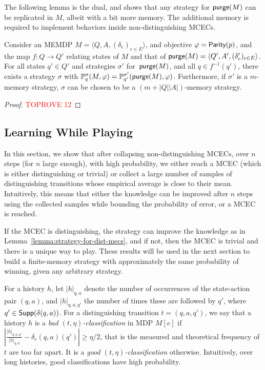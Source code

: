 \documentclass[a4paper,USenglish,cleveref, autoref, thm-restate]{lipics-v2021}
\def\abs#1{\ensuremath{\lvert #1 \rvert}}
\newcommand{\tuple}[1]{\langle #1 \rangle}
\newcommand*{\pr}{\mathbb{P}}
\newcommand\Supp{\textrm{\sf Supp}}
\newcommand\Parity{\textrm{\sf Parity}}
\def\Act{A}
\newcommand\purge[1]{\textrm{\sf purge}(#1)}
\begin{document}
The following lemma is the dual, and shows that any strategy for $\purge{M}$ can be replicated in $M$,
albeit with a bit more memory. The additional memory is required to implement behaviors inside non-distinguishing MCECs.


\begin{lemma}
  \label{lemma:removing-nondist-cecs-stratmap-2}
    Consider an MEMDP $M=\tuple{Q,A,(\delta_e)_{e\in E}}$, and objective $\varphi=\Parity(p)$,
    and the map $f:Q\rightarrow Q'$ relating states of $M$ and that of $\purge{M} = \tuple{Q',A',(\delta_e')_{e\in E}}$.
    For all states $q'\in Q'$ and strategies $\sigma'$ for~$\purge{M}$, and all $q \in f^{-1}(q')$, 
    there exists a strategy $\sigma$ with
    $\pr_{q}^\sigma(M,\varphi) = \pr_{q'}^{\sigma'}(\purge{M},\varphi)$.
    Furthermore, if $\sigma'$ is a $m$-memory strategy, $\sigma$ can be chosen to be a
    $(m+\abs{Q}\abs{\Act})$-memory strategy.
\end{lemma}
\begin{proof}\textcolor{red}{TOPROVE 12}\end{proof}

\subsection{Learning While Playing}
\label{section:learning-while-playing}
In this section, we show that after collapsing non-distinguishing MCECs, over $n$ steps (for $n$ large enough),
with high probability,
we either reach a 
MCEC (which is either distinguishing or trivial) 
or collect a large number of samples of distinguishing transitions whose empirical average is close to their mean.
Intuitively, this means that either the knowledge can be improved after $n$ steps using the collected samples while bounding the probability of error, or a 
MCEC is reached. 

If the MCEC is distinguishing, the strategy can improve the knowledge as in Lemma~\ref{lemma:strategy-for-dist-mecs},
and if not, then the MCEC is trivial and there is a unique way to play.
These results will be used in the next section to build a finite-memory strategy with approximately the same probability of winning,
given any arbitrary strategy.

For a history $h$, let $\abs{h}_{q,a}$ denote the number of occurrences of the state-action pair $(q,a)$,
and $\abs{h}_{q,a,q'}$ the number of times these are followed by $q'$, where $q' \in\Supp(\delta(q,a))$.
For a distinguishing transition $t=(q,a,q')$, we say that a history $h$ is a
\emph{bad $(t,\eta)$-classification} in MDP $M[e]$ if 
$\left\lvert\frac{\abs{h}_{q,a,q'}}{\abs{h}_{q,a}} - \delta_{e}(q,a)(q')\right\rvert \geq \eta/2$, that is the measured and theoretical frequency of $t$ are too far apart.
It is a \emph{good $(t,\eta)$-classification} otherwise.
Intuitively, over long histories, good classifications have high probability.
\end{document}
